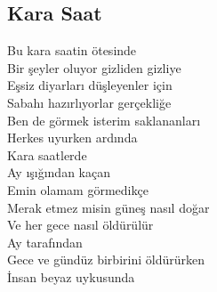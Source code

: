 \subsection{Kara Saat}

Bu kara saatin ötesinde \\
Bir şeyler oluyor gizliden gizliye \\
Eşsiz diyarları düşleyenler için \\
Sabahı hazırlıyorlar gerçekliğe \\

\noindent\newline
Ben de görmek isterim saklananları \\
Herkes uyurken ardında \\
Kara saatlerde \\
Ay ışığından kaçan \\

\noindent\newline
Emin olamam görmedikçe \\
Merak etmez misin güneş nasıl doğar \\
Ve her gece nasıl öldürülür \\
Ay tarafından \\

\noindent\newline
Gece ve gündüz birbirini öldürürken \\
İnsan beyaz uykusunda \\